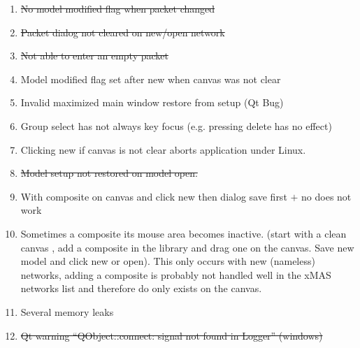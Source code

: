 \begin{enumerate} \label{sec:bug-list}
\item	\st{No model modified flag when packet changed}
\item	\st{Packet dialog not cleared on new/open network}
\item \st{Not able to enter an empty packet}
\item	Model modified flag set after new when canvas was not clear
\item	Invalid maximized main window restore from setup (Qt Bug)
\item	Group select has not always key focus (e.g. pressing delete has no effect)
\item	Clicking new if canvas is not clear aborts application under Linux.
\item	\st{Model setup not restored on model open.}
\item With composite on canvas and click new then dialog save first $+$ no does not
work
\item Sometimes a composite its mouse area becomes inactive. (start with a clean
canvas , add a composite in the library and drag one on the canvas. Save new
model and click new or open). This only occurs with new (nameless) networks,
adding a composite is probably not handled well in the xMAS networks list and
therefore do only exists on the canvas.
\item	Several memory leaks
\item \st{Qt warning ``QObject::connect: signal not found in Logger'' (windows)}
\end{enumerate}
